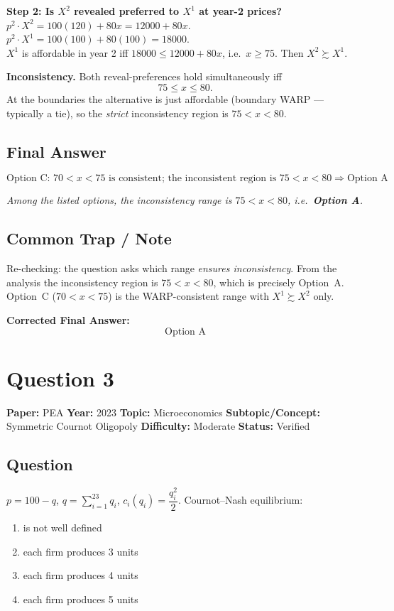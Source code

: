 \documentclass[11pt]{article}
\begin{document}
\medskip\noindent\textbf{Step 2: Is $X^2$ revealed preferred to $X^1$ at year-2 prices?}\\
$p^2\cdot X^2=100(120)+80x=12000+80x$. $p^2\cdot X^1=100(100)+80(100)=18000$.\\
$X^1$ is affordable in year 2 iff $18000\le 12000+80x$, i.e.\ $x\ge 75$. Then $X^2\succsim X^1$.

\medskip\noindent\textbf{Inconsistency.} Both reveal-preferences hold simultaneously iff
\[
75\le x \le 80.
\]
At the boundaries the alternative is just affordable (boundary WARP --- typically a tie), so the \emph{strict} inconsistency region is $75<x<80$.

\subsection*{Final Answer}
\[
\boxed{\text{Option C: } 70<x<75 \text{ is consistent; the inconsistent region is } 75<x<80 \Rightarrow \text{Option A}}
\]

\noindent\emph{Among the listed options, the inconsistency range is $75<x<80$, i.e.\ \textbf{Option A}.}

\subsection*{Common Trap / Note}
Re-checking: the question asks which range \emph{ensures inconsistency}. From the analysis the inconsistency region is $75<x<80$, which is precisely Option~A. Option~C ($70<x<75$) is the WARP-consistent range with $X^1\succsim X^2$ only.

\medskip
\noindent\textbf{Corrected Final Answer:}
\[
\boxed{\text{Option A}}
\]

\medskip

\section*{Question 3}
\textbf{Paper:} PEA \quad \textbf{Year:} 2023 \quad \textbf{Topic:} Microeconomics \quad \textbf{Subtopic/Concept:} Symmetric Cournot Oligopoly \quad \textbf{Difficulty:} Moderate \quad \textbf{Status:} Verified

\subsection*{Question}
$p=100-q$, $q=\sum_{i=1}^{23}q_i$, $c_i(q_i)=\dfrac{q_i^{2}}{2}$. Cournot--Nash equilibrium:
\begin{enumerate}[label=(\Alph*)]
\item is not well defined
\item each firm produces 3 units
\item each firm produces 4 units
\item each firm produces 5 units
\end{enumerate}
\end{document}
